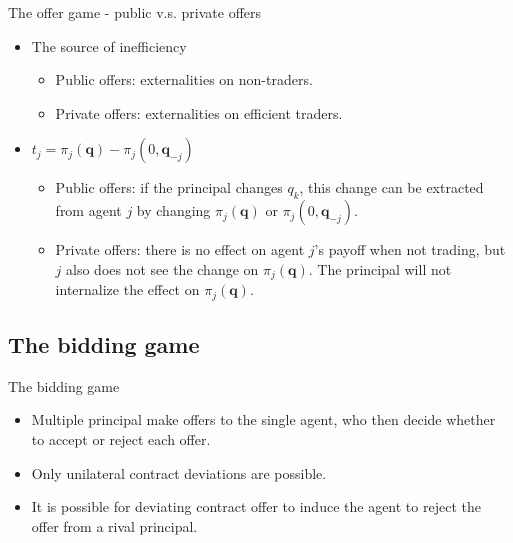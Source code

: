 \documentclass[aspectratio=169]{beamer}  %
\begin{document}
\begin{frame}{The offer game - public v.s. private offers}
    \begin{itemize}
        \item The source of inefficiency \vspace{.2cm}
        \begin{itemize}
            \item Public offers: externalities on non-traders. \vspace{.2cm}
            \item Private offers: externalities on efficient traders. \vspace{.2cm} 
        \end{itemize}
        \item $t_j = \pi_j(\mathbf{q}) - \pi_j(0,\mathbf{q}_{-j})$\vspace{.2cm}
        \begin{itemize}
            \item Public offers: if the principal changes $q_k$, this change can be extracted from agent $j$ by changing $\pi_j(\mathbf{q})$ or $\pi_j(0,\mathbf{q}_{-j})$. \vspace{.2cm}
            \item Private offers: there is no effect on agent $j$'s payoff when not trading, but $j$ also does not see the change on $\pi_j(\mathbf{q})$. The principal will not internalize the effect on $\pi_j(\mathbf{q})$.
        \end{itemize}
    \end{itemize}   
    
\end{frame}



\subsection{The bidding game}
\begin{frame}{The bidding game}
    \begin{itemize}
        \item Multiple principal make offers to the single agent, who then decide whether to accept or reject each offer. \vspace{.2cm}
        \item Only unilateral contract deviations are possible. \vspace{.2cm}
        \item It is possible for deviating contract offer to induce the agent to reject the offer from a rival principal. \vspace{.2cm}
    \end{itemize}
\end{frame}
\end{document}

